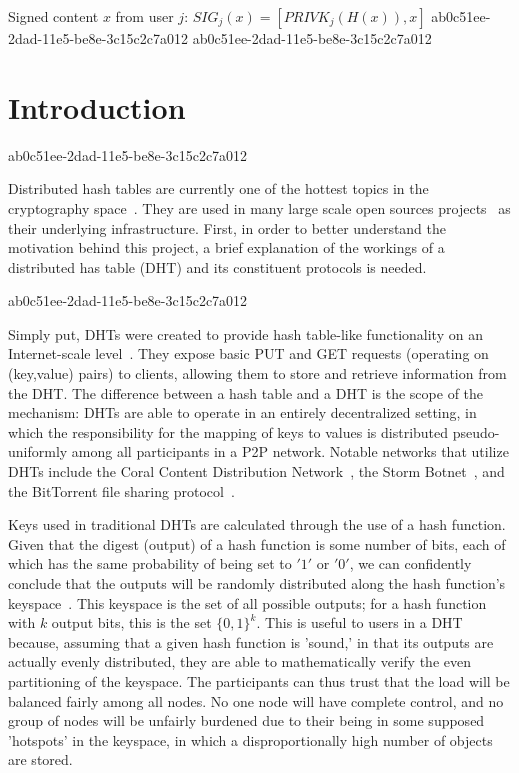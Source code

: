 \documentclass[12pt]{article}
\begin{document}
Signed content $x$ from user $j$: $SIG_j(x) = \left[ PRIVK_j( H(x) ), x \right]$
ab0c51ee-2dad-11e5-be8e-3c15c2c7a012
ab0c51ee-2dad-11e5-be8e-3c15c2c7a012\section{Introduction}
ab0c51ee-2dad-11e5-be8e-3c15c2c7a012\par Distributed hash tables are currently one of the hottest topics in the cryptography space~\cite{Stoica:2001dj,Rowstron:2001ea,Ratnasamy:2001wn}. They are used in many large scale open sources projects~\cite{Freitas:2013tb,Xu:2010vs,Perfitt:2010fh} as their underlying infrastructure. First, in order to better understand the motivation behind this project, a brief explanation of the workings of a distributed has table (DHT) and its constituent protocols is needed.

ab0c51ee-2dad-11e5-be8e-3c15c2c7a012\par Simply put, DHTs were created to provide hash table-like functionality on an Internet-scale level~\cite{Ratnasamy:2001wn}. They expose basic PUT and GET requests (operating on (key,value) pairs) to clients, allowing them to store and retrieve information from the DHT. The difference between a hash table and a DHT is the scope of the mechanism: DHTs are able to operate in an entirely decentralized setting, in which the responsibility for the mapping of keys to values is distributed pseudo-uniformly among all participants in a P2P network. Notable networks that utilize DHTs include the Coral Content Distribution Network~\cite{Freedman:2004vb}, the Storm Botnet~\cite{Holz:2008uk}, and the BitTorrent file sharing protocol~\cite{Cohen:y1_8mBnw}.

\par Keys used in traditional DHTs are calculated through the use of a hash function. Given that the digest (output) of a hash function is some number of bits, each of which has the same probability of being set to $'1'$ or $'0'$, we can confidently conclude that the outputs will be randomly distributed along the hash function's keyspace~. This keyspace is the set of all possible outputs; for a hash function with $k$ output bits, this is the set $\{0,1\}^k$. This is useful to users in a DHT because, assuming that a given hash function is 'sound,' in that its outputs are actually evenly distributed, they are able to mathematically verify the even partitioning of the keyspace. The participants can thus trust that the load will be balanced fairly among all nodes. No one node will have complete control, and no group of nodes will be unfairly burdened due to their being in some supposed 'hotspots' in the keyspace, in which a disproportionally high number of objects are stored.~
\end{document}

